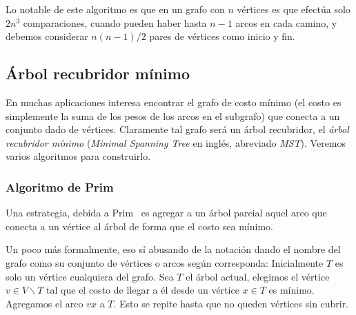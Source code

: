   Lo notable de este algoritmo es que en un grafo con \(n\) vértices
  es que efectúa solo \(2 n^3\) comparaciones,
  cuando pueden haber hasta \(n - 1\) arcos en cada camino,
  y debemos considerar \(n (n -1) / 2 \) pares de vértices
  como inicio y fin.


\subsection{Árbol recubridor mínimo}
\label{sec:MST}

  En muchas aplicaciones interesa encontrar el grafo de costo mínimo
  (el costo es simplemente la suma de los pesos de los arcos
   en el subgrafo)
  que conecta a un conjunto dado de vértices.
  Claramente tal grafo será un árbol recubridor,
  el \emph{árbol recubridor mínimo}
  (\emph{\foreignlanguage{english}{Minimal Spanning Tree}}
   en inglés,
   abreviado \emph{MST}).
  Veremos varios algoritmos para construirlo.

\subsubsection{Algoritmo de Prim}
\label{sec:MST-Prim}

  Una estrategia,
  debida a Prim~%
   \cite{prim57:_short_connection_networks}
   es agregar a un árbol parcial
  aquel arco que conecta a un vértice al árbol
  de forma que el costo sea mínimo.%

  Un poco más formalmente,
  eso sí abusando de la notación dando el nombre del grafo
  como su conjunto de vértices o arcos según corresponda:
  Inicialmente \(T\) es solo un vértice cualquiera del grafo.
  Sea \(T\) el árbol actual,
  elegimos el vértice \(v \in V \smallsetminus T\)
  tal que el costo de llegar a él
  desde un vértice \(x \in T\) es mínimo.
  Agregamos el arco \(v x\) a \(T\).
  Esto se repite hasta que no queden vértices sin cubrir.

